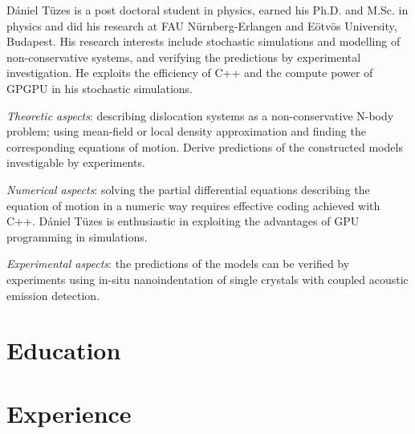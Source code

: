 \documentclass[11pt,a4paper,sans]{moderncv}        %
\begin{document}
\makecvtitle
Dániel Tüzes is a post doctoral student in physics, earned his Ph.D. and M.Sc. in physics and did his research at FAU Nürnberg-Erlangen and Eötvös University, Budapest. His research interests include stochastic simulations and modelling of non-conservative systems, and verifying the predictions by experimental investigation. He exploits the efficiency of C++ and the compute power of GPGPU in his stochastic simulations.\vspace{0.5em}

\textit{Theoretic aspects}: describing dislocation systems as a non-conservative N-body problem; using mean-field or local density approximation and finding the corresponding equations of motion. Derive predictions of the constructed models investigable by experiments.\vspace{0.5em}

\textit{Numerical aspects}: solving the partial differential equations describing the equation of motion in a numeric way requires effective coding achieved with C++. Dániel Tüzes is enthusiastic in exploiting the advantages of GPU programming in simulations.\vspace{0.5em}

\textit{Experimental aspects}: the predictions of the models can be verified by experiments using in-situ nanoindentation of single crystals with coupled acoustic emission detection.

\section{Education}

\section{Experience}
\end{document}
